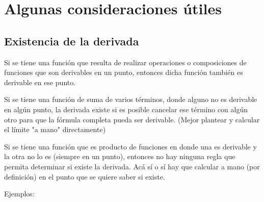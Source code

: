 \documentclass{report}
\begin{document}
	\section{Algunas consideraciones útiles}
		\subsection{Existencia de la derivada} 
			Si se tiene una función que resulta de realizar operaciones o composiciones de funciones que son derivables en un punto, entonces dicha función también es derivable en ese punto.
			
			Si se tiene una función de suma de varios términos, donde alguno no es derivable en algún punto, la derivada existe si es posible cancelar ese término con algún otro para que la fórmula completa pueda ser derivable. (Mejor plantear y calcular el límite "a mano" directamente)
			
			Si se tiene una función que es producto de funciones en donde una es derivable y la otra no lo es (siempre en un punto), entonces no hay ninguna regla que permita determinar si existe la derivada. Acá sí o sí hay que calcular a mano (por definición) en el punto que se quiere saber si existe.
			
			Ejemplos:
			
\end{document}
